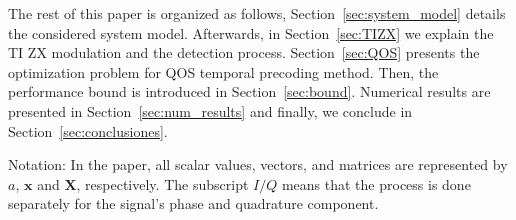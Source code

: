  The rest of this paper is organized as follows, Section~\ref{sec:system_model} details the considered system model. 
Afterwards, in Section~\ref{sec:TIZX} we explain the TI ZX modulation and the detection process. Section~\ref{sec:QOS} presents the optimization problem for QOS temporal precoding method. Then, the performance bound is introduced in Section~\ref{sec:bound}. Numerical results are presented in Section~\ref{sec:num_results} and
finally, we conclude in Section~\ref{sec:conclusiones}.

Notation: In the paper, all scalar values, vectors, and matrices are represented by $a$, ${\boldsymbol{x}}$ and ${\boldsymbol{X}}$, respectively. \textcolor{c}{The subscript $I/Q$ means that the process is done separately for the signal's phase and quadrature component.}
